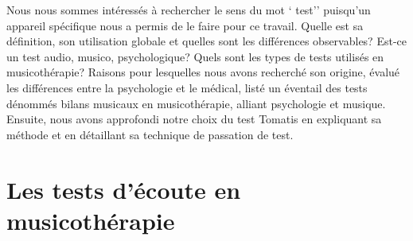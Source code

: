 Nous nous sommes intéressés à rechercher le sens du mot  ` test'' puisqu'un appareil spécifique nous a 
permis de le faire pour ce travail. Quelle est sa définition, son utilisation globale et quelles sont les 
différences observables?
Est-ce un test audio, musico, psychologique?
Quels sont les types de tests utilisés en musicothérapie?
Raisons pour lesquelles nous avons recherché son origine, évalué les différences entre la psychologie et 
le médical, listé un éventail des tests dénommés bilans musicaux en musicothérapie, alliant psychologie 
et musique. Ensuite,  nous avons approfondi notre choix du test Tomatis en expliquant sa méthode et en 
détaillant sa technique de passation de test.


\section{Les  tests d'écoute en musicothérapie} 

